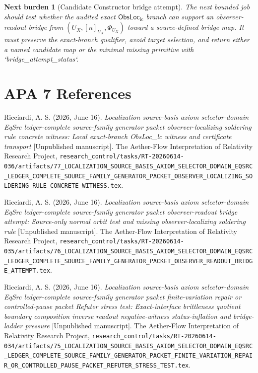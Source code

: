 \documentclass[11pt]{article}
\newcommand{\ObsLocLC}{\mathsf{ObsLoc}_{\mathrm{lc}}}
\newtheorem{nextburden}{Next burden}
\begin{document}
\begin{nextburden}[Candidate Constructor bridge attempt]
The next bounded job should test whether the audited exact
\(\ObsLocLC\) branch can support an observer-readout bridge from
\((U_X,[n]_{U_X},\Phi_{U_X})\) toward a source-defined bridge map. It
must preserve the exact-branch qualifier, avoid target selection, and
return either a named candidate map or the minimal missing primitive
with `bridge_attempt_status`.
\end{nextburden}

\section*{APA 7 References}

Ricciardi, A. S. (2026, June 16). \emph{Localization source-basis
axiom selector-domain EqSrc ledger-complete source-family generator
packet observer-localizing soldering rule concrete witness: Local
exact-branch ObsLoc_lc witness and certificate transport}
[Unpublished manuscript]. The Aether-Flow Interpretation of
Relativity Research Project,
\texttt{research\_control/tasks/RT-20260614-036/artifacts/77\_LOCALIZATION\_SOURCE\_BASIS\_AXIOM\_SELECTOR\_DOMAIN\_EQSRC\_LEDGER\_COMPLETE\_SOURCE\_FAMILY\_GENERATOR\_PACKET\_OBSERVER\_LOCALIZING\_SOLDERING\_RULE\_CONCRETE\_WITNESS.tex}.

Ricciardi, A. S. (2026, June 16). \emph{Localization source-basis
axiom selector-domain EqSrc ledger-complete source-family generator
packet observer-readout bridge attempt: Source-only normal orbit test
and missing observer-localizing soldering rule} [Unpublished
manuscript]. The Aether-Flow Interpretation of Relativity Research
Project,
\texttt{research\_control/tasks/RT-20260614-035/artifacts/76\_LOCALIZATION\_SOURCE\_BASIS\_AXIOM\_SELECTOR\_DOMAIN\_EQSRC\_LEDGER\_COMPLETE\_SOURCE\_FAMILY\_GENERATOR\_PACKET\_OBSERVER\_READOUT\_BRIDGE\_ATTEMPT.tex}.

Ricciardi, A. S. (2026, June 16). \emph{Localization source-basis
axiom selector-domain EqSrc ledger-complete source-family generator
packet finite-variation repair or controlled-pause packet Refuter
stress test: Exact-interface brittleness quotient boundary
composition inverse readout negative-witness status-inflation and
bridge-ladder pressure} [Unpublished manuscript]. The Aether-Flow
Interpretation of Relativity Research Project,
\texttt{research\_control/tasks/RT-20260614-034/artifacts/75\_LOCALIZATION\_SOURCE\_BASIS\_AXIOM\_SELECTOR\_DOMAIN\_EQSRC\_LEDGER\_COMPLETE\_SOURCE\_FAMILY\_GENERATOR\_PACKET\_FINITE\_VARIATION\_REPAIR\_OR\_CONTROLLED\_PAUSE\_PACKET\_REFUTER\_STRESS\_TEST.tex}.
\end{document}

